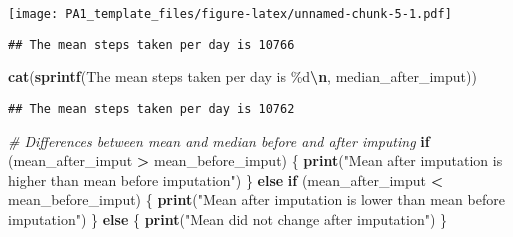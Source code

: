 \documentclass[
]{article}
\newenvironment{Shaded}{\begin{snugshade}}{\end{snugshade}}
\newcommand{\CommentTok}[1]{\textcolor[rgb]{0.56,0.35,0.01}{\textit{#1}}}
\newcommand{\ControlFlowTok}[1]{\textcolor[rgb]{0.13,0.29,0.53}{\textbf{#1}}}
\newcommand{\DecValTok}[1]{\textcolor[rgb]{0.00,0.00,0.81}{#1}}
\newcommand{\FunctionTok}[1]{\textcolor[rgb]{0.13,0.29,0.53}{\textbf{#1}}}
\newcommand{\NormalTok}[1]{#1}
\newcommand{\OtherTok}[1]{\textcolor[rgb]{0.56,0.35,0.01}{#1}}
\newcommand{\SpecialCharTok}[1]{\textcolor[rgb]{0.81,0.36,0.00}{\textbf{#1}}}
\newcommand{\StringTok}[1]{\textcolor[rgb]{0.31,0.60,0.02}{#1}}
\begin{document}
\texttt{[image: PA1\_template\_files/figure-latex/unnamed-chunk-5-1.pdf]}

\begin{Shaded}
\end{Shaded}

\begin{verbatim}
## The mean steps taken per day is 10766
\end{verbatim}

\begin{Shaded}
\begin{Highlighting}[]
\FunctionTok{cat}\NormalTok{(}\FunctionTok{sprintf}\NormalTok{(}\StringTok{\textquotesingle{}The mean steps taken per day is \%d}\SpecialCharTok{\textbackslash{}n}\StringTok{\textquotesingle{}}\NormalTok{, median\_after\_imput))}
\end{Highlighting}
\end{Shaded}

\begin{verbatim}
## The mean steps taken per day is 10762
\end{verbatim}

\begin{Shaded}
\begin{Highlighting}[]
\CommentTok{\# Differences between mean and median before and after imputing}
\ControlFlowTok{if}\NormalTok{ (mean\_after\_imput }\SpecialCharTok{\textgreater{}}\NormalTok{ mean\_before\_imput) \{}
  \FunctionTok{print}\NormalTok{(}\StringTok{"Mean after imputation is higher than mean before imputation"}\NormalTok{)}
\NormalTok{\} }\ControlFlowTok{else} \ControlFlowTok{if}\NormalTok{ (mean\_after\_imput }\SpecialCharTok{\textless{}}\NormalTok{ mean\_before\_imput) \{}
  \FunctionTok{print}\NormalTok{(}\StringTok{"Mean after imputation is lower than mean before imputation"}\NormalTok{)}
\NormalTok{\} }\ControlFlowTok{else}\NormalTok{ \{}
  \FunctionTok{print}\NormalTok{(}\StringTok{"Mean did not change after imputation"}\NormalTok{)}
\NormalTok{\}}
\end{Highlighting}
\end{Shaded}
\end{document}
